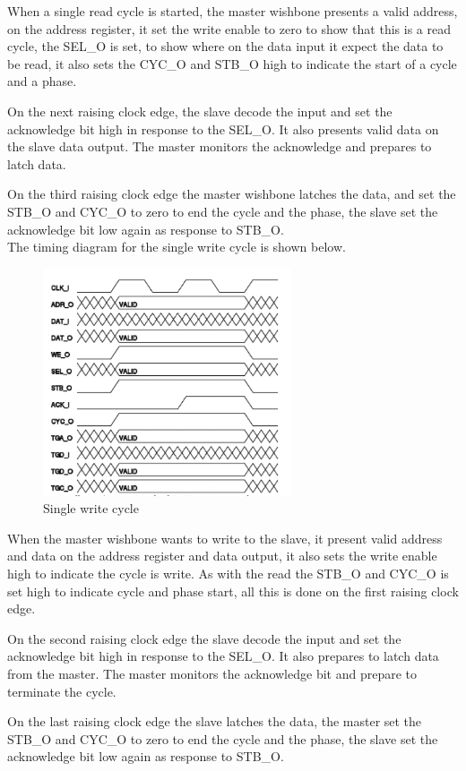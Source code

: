 When a single read cycle is started, the master wishbone presents a valid address, on the address register, it set the write enable to zero to show that this is a read cycle, the SEL\_O is set, to show where on the data input it expect the data to be read, it also sets the CYC\_O and STB\_O high to indicate the start of a cycle and a phase.


On the next raising clock edge, the slave decode the input and set the acknowledge bit high in response to the SEL\_O. It also presents valid data on the slave data output. The master monitors the acknowledge and prepares to latch data.


On the third raising clock edge the master wishbone latches the data, and set the STB\_O and CYC\_O to zero to end the cycle and the phase, the slave set the acknowledge bit low again as response to STB\_O.\\
The timing diagram for the single write cycle is shown below.
\begin{figure}[H]
	\begin{centering}
		 \includegraphics[width=0.65\textwidth]{images/wb_single_write.png}
		\caption{Single write cycle}
	\end{centering}
\end{figure}
When the master wishbone wants to write to the slave, it present valid address and data on the address register and data output, it also sets the write enable high to indicate the cycle is write. As with the read the STB\_O and CYC\_O is set high to indicate cycle and phase start, all this is done on the first raising clock edge.

On the second raising clock edge the slave decode the input and set the acknowledge bit high in response to the SEL\_O. It also prepares to latch data from the master. The master monitors the acknowledge bit and prepare to terminate the cycle.

On the last raising clock edge the slave latches the data, the master set the STB\_O and CYC\_O to zero to end the cycle and the phase, the slave set the acknowledge bit low again as response to STB\_O.

